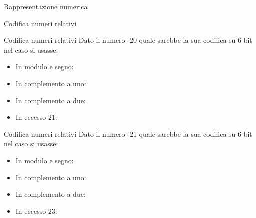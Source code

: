 \documentclass[11pt]{article}
\begin{document}
\begin{quiz}{Rappresentazione numerica}
\begin{cloze}[points=1,shuffle=false]{Codifica numeri relativi}
\end{cloze}

\begin{cloze}[points=1,shuffle=false]{Codifica numeri relativi}
Dato il numero -20 quale sarebbe la sua codifica su 6 bit nel caso si usasse:

\begin{itemize}
\item In modulo e segno: 
\item In complemento a uno: 
\item In complemento a due: 
\item In eccesso $21$: 
\end{itemize}
\end{cloze}

\begin{cloze}[points=1,shuffle=false]{Codifica numeri relativi}
Dato il numero -21 quale sarebbe la sua codifica su 6 bit nel caso si usasse:

\begin{itemize}
\item In modulo e segno: 
\item In complemento a uno: 
\item In complemento a due: 
\item In eccesso $23$: 
\end{itemize}
\end{cloze}


\end{quiz}
\end{document}
